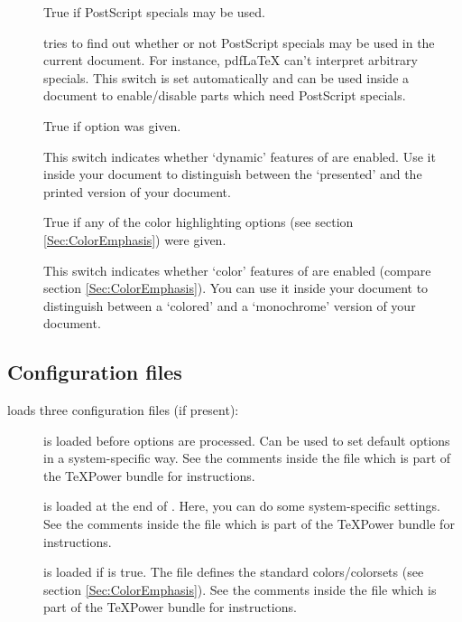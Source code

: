 \documentclass[12pt]{scrartcl}
\let\newslide=\relax
\begin{document}
\begin{description}
\item[] True if PostScript\textsuperscript{\textregistered} specials may be
  used.

   tries to find out whether or not PostScript\textsuperscript{\textregistered} specials may be used in
  the current document. For instance, pdf\LaTeX{} can't interpret arbitrary specials. This switch is set automatically
  and can be used inside a document to enable/disable parts which need PostScript\textsuperscript{\textregistered}
  specials.

\newslide

\item[] True if  option was given.

  This switch indicates whether `dynamic' features of  are enabled. Use it inside your document
  to distinguish between the `presented' and the printed version of your document.

\item[] True if any of the color highlighting options (see section
  \ref{Sec:ColorEmphasis}) were given.

  This switch indicates whether `color' features of  are enabled (compare section
  \ref{Sec:ColorEmphasis}). You can use it inside your document to distinguish between a `colored' and a `monochrome'
  version of your document.
\end{description}

\newslide

\subsection{Configuration files}\label{Sec:Config}
 loads three configuration files (if present):
\begin{description}
\item[]
  is loaded before options are processed. Can be used to set default options
  in a system-specific way. See the comments inside the file
   which is part of the \TeX Power bundle
  for instructions.

\item[]
  is loaded at the end of . Here, you can do some
  system-specific settings. See the comments inside the
  file  which is part of the
  \TeX Power bundle for instructions.

\item[]
  is loaded if  is true. The file defines the standard
  colors/colorsets (see section \ref{Sec:ColorEmphasis}). See the
  comments inside the file  which is part of the
  \TeX Power bundle for instructions.
\end{description}
\end{document}
